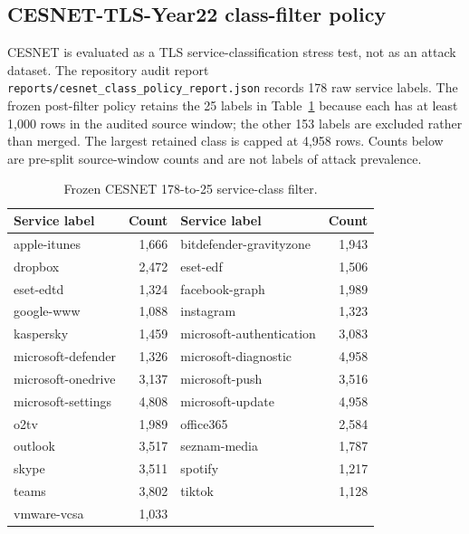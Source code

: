 \documentclass[pdflatex,referee,lineno,sn-basic,Numbered]{sn-jnl}
\begin{document}
\begin{appendices}
\section{CESNET-TLS-Year22 class-filter policy}
\label{app:cesnet-policy}
\renewcommand{\thetable}{A\arabic{table}}
\renewcommand{\theHtable}{A.\arabic{table}}
CESNET is evaluated as a TLS service-classification stress test, not as an attack
dataset. The repository audit report
\texttt{reports/cesnet\_class\_policy\_report.json} records 178 raw service labels.
The frozen post-filter policy retains the 25 labels in Table~\ref{tab:cesnet-policy}
because each has at least 1,000 rows in the audited source window; the other 153
labels are excluded rather than merged. The largest retained class is capped at
4,958 rows. Counts below are pre-split source-window counts and are not labels of
attack prevalence.

\begin{table}[ht]
\centering
\caption{Frozen CESNET 178-to-25 service-class filter.}
\label{tab:cesnet-policy}
\footnotesize
\begin{tabular}{lr@{\qquad}lr}
\hline
Service label & Count & Service label & Count \\
\hline
apple-itunes & 1,666 & bitdefender-gravityzone & 1,943 \\
dropbox & 2,472 & eset-edf & 1,506 \\
eset-edtd & 1,324 & facebook-graph & 1,989 \\
google-www & 1,088 & instagram & 1,323 \\
kaspersky & 1,459 & microsoft-authentication & 3,083 \\
microsoft-defender & 1,326 & microsoft-diagnostic & 4,958 \\
microsoft-onedrive & 3,137 & microsoft-push & 3,516 \\
microsoft-settings & 4,808 & microsoft-update & 4,958 \\
o2tv & 1,989 & office365 & 2,584 \\
outlook & 3,517 & seznam-media & 1,787 \\
skype & 3,511 & spotify & 1,217 \\
teams & 3,802 & tiktok & 1,128 \\
vmware-vcsa & 1,033 & & \\
\hline
\end{tabular}
\end{table}
\end{appendices}
\end{document}
